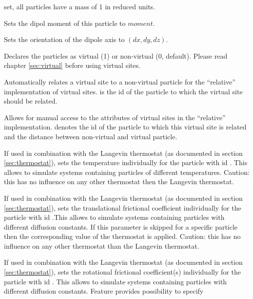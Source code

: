 \begin{arguments}
  set, all particles have a mass of 1 in reduced units.
\item[\opt{dipm \var{moment}}] Sets the dipol moment of this particle to $moment$.
\item[\opt{dip \var{dx} \var{dy} \var{dz}}] Sets the orientation of the
  dipole axis to $(dx,dy,dz)$.
\item[\opt{virtual \var{v}}] Declares the particles as virtual (1) or
  non-virtual (0, default). Please read chapter \ref{sec:virtual}
  before using virtual sites.
\item[\opt{vs\_auto\_relate\_to \var{pid}}] Automatically relates a
  virtual site to a non-virtual particle for the ``relative''
  implementation of virtual sites.  is the id of the particle
  to which the virtual site should be related.
\item[\opt{vs\_relative \var{pid} \var{distance}}] Allows for manual
  access to the attributes of virtual sites in the ``relative''
  implementation.  denotes the id of the particle to which
  this virtual site is related and  the distance between
  non-virtual and virtual particle.
\item[\opt{temp \var{T}}] If used in combination with the Langevin
  thermostat (as documented in section \ref{sec:thermostat}), sets the
  temperature  individually for the particle with id
  . This allows to simulate systems containing particles of
  different temperatures. Caution: this has no influence on any other
  thermostat then the Langevin thermostat.
\item[\opt{gamma \var{g}}] If used in combination with the Langevin
  thermostat (as documented in section \ref{sec:thermostat}), sets the
  translational frictional coefficient  individually for the
  particle with id .This allows to simulate systems
  containing particles with different diffusion constants.
  If this parameter is skipped for a specific particle then
  the corresponding value of the thermostat is applied.
  Caution: this has no influence on any other thermostat than the
  Langevin thermostat.
\item[\opt{gamma\_rot \alt{\var{grot} \asep \var{grotx} \var{groty} \var{grotz}}}]
  If used in combination with the Langevin thermostat
  (as documented in section \ref{sec:thermostat}), sets the
  rotational frictional coefficient(s) individually for the
  particle with id . This allows to simulate systems
  containing particles with different diffusion constants.
  Feature  provides possibility to specify

\end{arguments}
